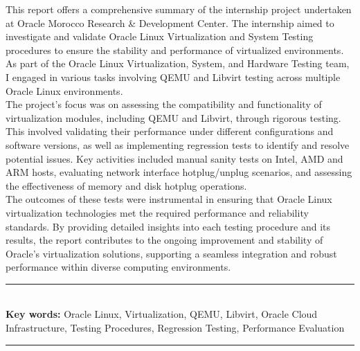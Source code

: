 

This report offers a comprehensive summary of the internship project undertaken at Oracle Morocco Research \& Development Center. The internship aimed to investigate and validate Oracle Linux Virtualization and System Testing procedures to ensure the stability and performance of virtualized environments. As part of the Oracle Linux Virtualization, System, and Hardware Testing team, I engaged in various tasks involving QEMU and Libvirt testing across multiple Oracle Linux environments. \\

The project's focus was on assessing the compatibility and functionality of virtualization modules, including QEMU and Libvirt, through rigorous testing. This involved validating their performance under different configurations and software versions, as well as implementing regression tests to identify and resolve potential issues. Key activities included manual sanity tests on Intel, AMD and ARM hosts, evaluating network interface hotplug/unplug scenarios, and assessing the effectiveness of memory and disk hotplug operations. \\

The outcomes of these tests were instrumental in ensuring that Oracle Linux virtualization technologies met the required performance and reliability standards. By providing detailed insights into each testing procedure and its results, the report contributes to the ongoing improvement and stability of Oracle's virtualization solutions, supporting a seamless integration and robust performance within diverse computing environments.
\bigskip

\noindent\rule{\textwidth}{0.3mm} \\[0.6cm] 
\textbf{Key words:} 
Oracle Linux, Virtualization, QEMU, Libvirt, Oracle Cloud Infrastructure, Testing Procedures, Regression Testing, Performance Evaluation
\\
\noindent\rule{\textwidth}{0.3mm} \\[0.6cm]